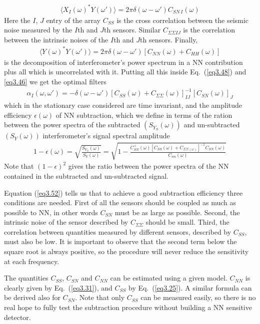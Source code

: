 \begin{eqnarray}
		\langle X_{I}(\omega)^{*}Y(\omega')\rangle=2\pi\delta(\omega-\omega')C_{SN\,I}(\omega)
		\label{eq3.49}
\end{eqnarray}
Here the $I$, $J$ entry of the array $C_{SS}$ is the cross correlation between the seismic noise measured by the $I$th and $J$th sensors. Similar $C_{\Sigma\Sigma IJ}$ is the correlation between the intrinsic noises of the $I$th and $J$th sensors. Finally,
\begin{eqnarray}
		\langle Y(\omega)^{*}Y(\omega')\rangle=2\pi\delta(\omega-\omega')[C_{NN}(\omega)+C_{HH}(\omega)]
		\label{eq3.50}
\end{eqnarray}
is the decomposition of interferometer's power spectrum in a NN contribution plus all which is uncorrelated with it. Putting all this inside Eq.~(\ref{eq3.48}) and \ref{eq3.46} we get the optimal filters
\begin{eqnarray}
		\alpha_{I}(\omega,\omega')=-\delta(\omega-\omega')[C_{SS}(\omega)+C_{\Sigma\Sigma}(\omega)]^{-1}_{IJ}[C_{SN}(\omega)]_{J}
		\label{eq3.51}
\end{eqnarray}
which in the stationary case considered are time invariant, and the amplitude efficiency $\epsilon(\omega)$ of NN subtraction, which we define in terms of the ration between the power spectra of the subtracted $(S_{Y_{S}}(\omega))$ and un-subtracted $(S_{Y}(\omega))$ interferometer's signal spectral amplitude 
\begin{eqnarray}
		1-\epsilon(\omega)=\sqrt{\frac{S_{Y_{S}}(\omega)}{S_{Y}(\omega)}}=\sqrt{1-\frac{C^{+}_{SN}(\omega)[C_{SS}(\omega)+C_{\Sigma\Sigma(\omega)}]^{-1}C_{SN}(\omega)}{C_{nn}(\omega)}}
		\label{eq3.52}
\end{eqnarray}
Note that $(1-\epsilon)^{2}$ gives the ratio between the power spectra of the NN contained in the subtracted and un-subtracted signal. 

Equation (\ref{eq3.52}) tells us that to achieve a good subtraction efficiency three conditions are needed. First of all the sensors should be coupled as much as possible to NN, in other words $C_{SN}$ must be as large as possible. Second, the intrinsic noise of the sensor described by $C_{\Sigma\Sigma}$ should be small. Third, the correlation between quantities measured by different sensors, described by $C_{SS}$, must also be low. It is important to observe that the second term below the square root is always positive, so the procedure will never reduce the sensitivity at each frequency. 

The quantities $C_{SS}$, $C_{SN}$ and $C_{NN}$ can be estimated using a given model. $C_{NN}$ is clearly given by Eq.~(\ref{eq3.31}), and $C_{SS}$ by Eq.~(\ref{eq3.25}). A similar formula can be derived also for $C_{SN}$. Note that only $C_{SS}$ can be measured easily, so there is no real hope to fully  test the subtraction procedure without building a NN sensitive detector. 

